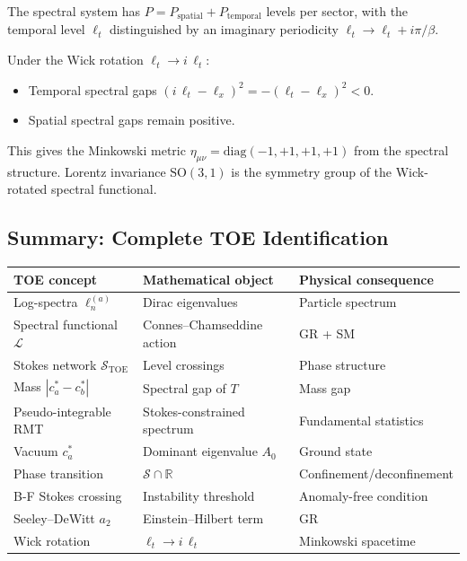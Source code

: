 \documentclass[12pt]{article}
\theoremstyle{definition}
\theoremstyle{remark}
\newcommand{\TOE}{\mathrm{TOE}}
\begin{document}
The spectral system has $P = P_\mathrm{spatial} + P_\mathrm{temporal}$
levels per sector, with the temporal level $\ell_t$ distinguished by
an imaginary periodicity $\ell_t \to \ell_t + i\pi/\beta$.

Under the Wick rotation $\ell_t \to i\,\ell_t$:
\begin{itemize}
\item Temporal spectral gaps $(i\,\ell_t - \ell_x)^2 = -(\ell_t-\ell_x)^2 < 0$.
\item Spatial spectral gaps remain positive.
\end{itemize}
This gives the Minkowski metric $\eta_{\mu\nu} = \mathrm{diag}(-1,+1,+1,+1)$
from the spectral structure.  Lorentz invariance $\mathrm{SO}(3,1)$
is the symmetry group of the Wick-rotated spectral functional.

\subsection{Summary: Complete TOE Identification}

\begin{center}
\begin{tabular}{lll}
\toprule
TOE concept & Mathematical object & Physical consequence \\
\midrule
Log-spectra $\ell_n^{(a)}$ & Dirac eigenvalues & Particle spectrum \\
Spectral functional $\mathcal{L}$ & Connes--Chamseddine action & GR + SM \\
Stokes network $\mathcal{S}_\TOE$ & Level crossings & Phase structure \\
Mass $|c_a^\ast - c_b^\ast|$ & Spectral gap of $T$ & Mass gap \\
Pseudo-integrable RMT & Stokes-constrained spectrum & Fundamental statistics \\
Vacuum $c_a^\ast$ & Dominant eigenvalue $A_0$ & Ground state \\
Phase transition & $\mathcal{S}\cap\mathbb{R}$ & Confinement/deconfinement \\
B-F Stokes crossing & Instability threshold & Anomaly-free condition \\
Seeley--DeWitt $a_2$ & Einstein--Hilbert term & GR \\
Wick rotation & $\ell_t \to i\,\ell_t$ & Minkowski spacetime \\
\bottomrule
\end{tabular}
\end{center}

\end{document}
